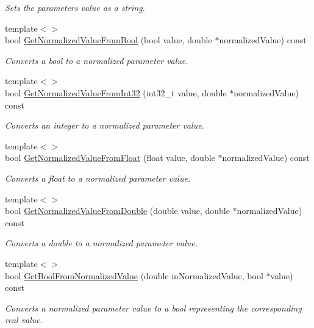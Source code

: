 \begin{DoxyCompactItemize}
\begin{DoxyCompactList}\small\item\em Sets the parameter\textquotesingle{}s value as a string. \end{DoxyCompactList}\item 
{\footnotesize template$<$$>$ }\\bool \mbox{\hyperlink{a01537_af937d0b1ddc00325bb539bcb6ab0aa66}{Get\+Normalized\+Value\+From\+Bool}} (bool value, double $\ast$normalized\+Value) const
\begin{DoxyCompactList}\small\item\em Converts a bool to a normalized parameter value. \end{DoxyCompactList}\item 
{\footnotesize template$<$$>$ }\\bool \mbox{\hyperlink{a01537_ae4f0bf9f8792da1e488b81c14587136c}{Get\+Normalized\+Value\+From\+Int32}} (int32\+\_\+t value, double $\ast$normalized\+Value) const
\begin{DoxyCompactList}\small\item\em Converts an integer to a normalized parameter value. \end{DoxyCompactList}\item 
{\footnotesize template$<$$>$ }\\bool \mbox{\hyperlink{a01537_a60c853975230efbbb70dcfaae80fdc6e}{Get\+Normalized\+Value\+From\+Float}} (float value, double $\ast$normalized\+Value) const
\begin{DoxyCompactList}\small\item\em Converts a float to a normalized parameter value. \end{DoxyCompactList}\item 
{\footnotesize template$<$$>$ }\\bool \mbox{\hyperlink{a01537_a85d148dd6e134226ac72f17da0abee0b}{Get\+Normalized\+Value\+From\+Double}} (double value, double $\ast$normalized\+Value) const
\begin{DoxyCompactList}\small\item\em Converts a double to a normalized parameter value. \end{DoxyCompactList}\item 
{\footnotesize template$<$$>$ }\\bool \mbox{\hyperlink{a01537_a69f7107140ac4721a9e4169d430e247a}{Get\+Bool\+From\+Normalized\+Value}} (double in\+Normalized\+Value, bool $\ast$value) const
\begin{DoxyCompactList}\small\item\em Converts a normalized parameter value to a bool representing the corresponding real value. \end{DoxyCompactList}\item 

\end{DoxyCompactItemize}
